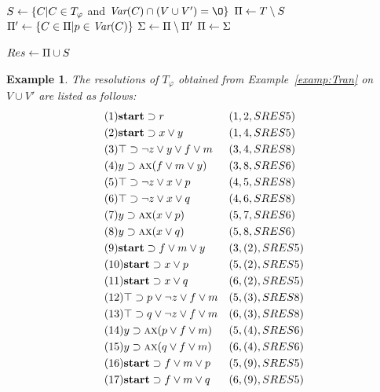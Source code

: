 \documentclass{article}
\newtheorem{example}{Example}
\begin{document}
\begin{algorithm}[!h]
\caption{$\emph{Resolution}(T,V \cup V')$}%
\label{alg:compute:Res}

$S\leftarrow \{C | C\in T_{\varphi}$ and $\Var(C) \cap (V\cup V')= {\O}\}$\;
$\Pi\leftarrow T\setminus S$ \;
 {
    $\Pi'\leftarrow \{C \in \Pi| p\in \textit{Var}(C)\}$ \;
    $\Sigma \leftarrow \Pi \setminus \Pi'$\;
     {
    }
    $\Pi\leftarrow \Sigma$\;
}

$Res\leftarrow \Pi \cup S$\;

\end{algorithm}


\begin{example}\label{examp:Res}
The resolutions of $T_{\varphi}$ obtained from Example~\ref{examp:Tran} on $V\cup V'$ are listed as follows:
\begin{align*}
&(1) \textbf{start} \supset r && (1,2,SRES 5)\\
&(2) \textbf{start} \supset x \vee y && (1,4,SRES 5)\\
&(3) \top \supset \neg z \vee y \vee f \vee m && (3, 4, SRES 8)\\
&(4) y \supset \textsc{a}\textsc{x}(f\vee m\vee y) && (3,8, SRES 6)\\
&(5) \top \supset \neg z \vee x \vee p && (4,5, SRES 8)\\
&(6) \top \supset \neg z \vee x \vee q && (4,6, SRES 8)\\
&(7) y \supset \textsc{a}\textsc{x}(x\vee p) && (5, 7, SRES 6)\\
&(8) y \supset \textsc{a}\textsc{x}(x\vee q) && (5, 8, SRES 6)\\
&(9) \textbf{start} \supset f\vee m \vee y && (3,(2), SRES 5) \\
&(10) \textbf{start} \supset x \vee p && (5,(2),SRES 5) \\
&(11) \textbf{start} \supset x \vee q && (6,(2), SRES 5)\\
&(12) \top \supset p \vee \neg z \vee f \vee m && (5,(3), SRES 8)\\
&(13) \top \supset q \vee \neg z \vee f \vee m && (6,(3), SRES 8)\\
&(14) y \supset \textsc{a}\textsc{x}(p \vee f\vee m) && (5, (4), SRES 6) \\
&(15) y \supset \textsc{a}\textsc{x}(q \vee f\vee m) && (6, (4), SRES 6) \\
&(16) \textbf{start} \supset f\vee m \vee p && (5, (9), SRES 5) \\
&(17) \textbf{start} \supset f\vee m \vee q && (6, (9), SRES 5)
\end{align*}
\end{example}
\end{document}
